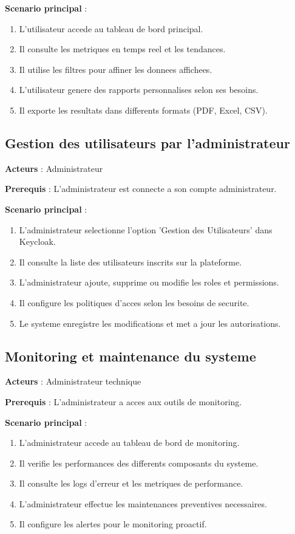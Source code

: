 \textbf{Scenario principal} :
\begin{enumerate}
    \item L'utilisateur accede au tableau de bord principal.
    \item Il consulte les metriques en temps reel et les tendances.
    \item Il utilise les filtres pour affiner les donnees affichees.
    \item L'utilisateur genere des rapports personnalises selon ses besoins.
    \item Il exporte les resultats dans differents formats (PDF, Excel, CSV).
\end{enumerate}

\subsection{Gestion des utilisateurs par l'administrateur}

\textbf{Acteurs} : Administrateur

\textbf{Prerequis} : L'administrateur est connecte a son compte administrateur.

\textbf{Scenario principal} :
\begin{enumerate}
    \item L'administrateur selectionne l'option 'Gestion des Utilisateurs' dans Keycloak.
    \item Il consulte la liste des utilisateurs inscrits sur la plateforme.
    \item L'administrateur ajoute, supprime ou modifie les roles et permissions.
    \item Il configure les politiques d'acces selon les besoins de securite.
    \item Le systeme enregistre les modifications et met a jour les autorisations.
\end{enumerate}

\subsection{Monitoring et maintenance du systeme}

\textbf{Acteurs} : Administrateur technique

\textbf{Prerequis} : L'administrateur a acces aux outils de monitoring.

\textbf{Scenario principal} :
\begin{enumerate}
    \item L'administrateur accede au tableau de bord de monitoring.
    \item Il verifie les performances des differents composants du systeme.
    \item Il consulte les logs d'erreur et les metriques de performance.
    \item L'administrateur effectue les maintenances preventives necessaires.
    \item Il configure les alertes pour le monitoring proactif.
\end{enumerate}

